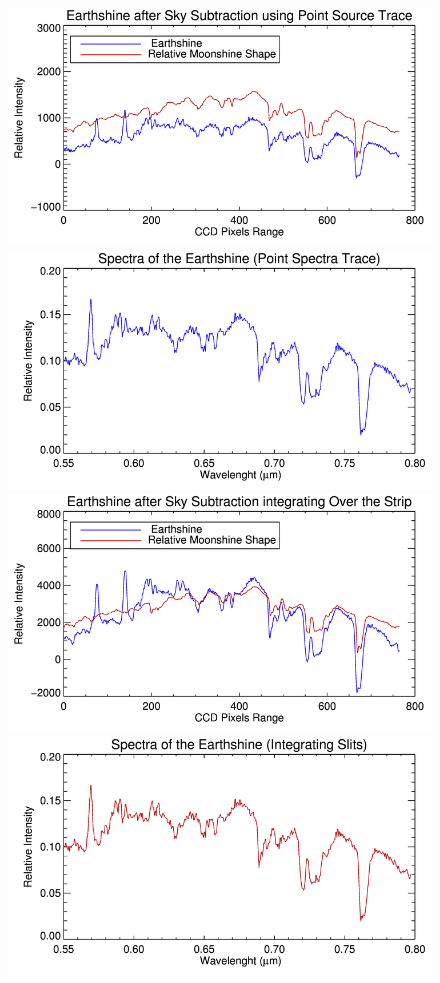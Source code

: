 \begin{figure}[htb]
\begin{center}
\includegraphics[scale=0.31]{plots/earth_point.png}
\includegraphics[scale=0.31]{plots/spectra1.png}
\includegraphics[scale=0.31]{plots/earth_strip.png}
\includegraphics[scale=0.31]{plots/spectra2.png}

\end{center}
\end{figure}

